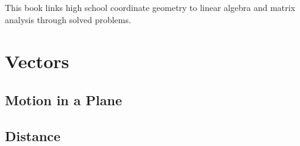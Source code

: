 \documentclass[11pt]{book}
\begin{document}

\setcounter{page}{1}

\begin{introduction}
This book links high school coordinate geometry to linear algebra and matrix analysis through solved problems.

\end{introduction}

\mainmatter

\chapter{Vectors}
\section{Motion in a Plane}

\iffalse
\section{Distance}

\end{document}
